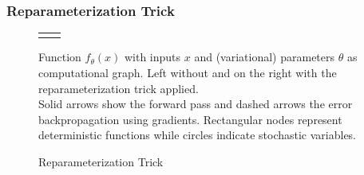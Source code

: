 \newpage

%





\subsubsection{Reparameterization Trick}

\begin{figure}
  \centering
  \begin{tabular}{c:c}
      \quad \quad
    &
      \quad

    \\
  \end{tabular}
  \caption{Reparameterization Trick}
  \label{fig:rep_trick}
  \medskip
  \small
  Function $f_\theta(x)$ with inputs $x$ and (variational) parameters $\theta$ as computational graph.
  Left without and on the right with the reparameterization trick applied.\\
  Solid arrows show the forward pass and dashed arrows the error backpropagation using gradients.
  Rectangular nodes represent deterministic functions while circles indicate stochastic variables.
\end{figure}

